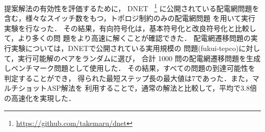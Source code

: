 \documentclass[dvipdfmx,a4paper]{jsarticle}
\begin{document}
提案解法の有効性を評価するために，
DNET%
~\footnote{%
\url{https://github.com/takemaru/dnet}}
に公開されている配電網問題を含む，様々なスイッチ数をもつ，トポロジ制約のみの配電網問題
を用いて実行実験を行なった．
その結果，有向符号化は，基本符号化と改良符号化と比較して，より多くの問
題をより高速に解くことが確認できた．
%
配電網遷移問題の実行実験については，DNETで公開されている実用規模の
問題({\sf fukui-tepco})に対して，実行可能解のペアをランダムに選び，
合計 1000 問の配電網遷移問題を生成しベンチマーク問題として使用した．
その結果，すべての問題の到達可能性を判定することができ，
得られた最短ステップ長の最大値は7であった．また，マルチショットASP解法を
利用することで，通常の解法と比較して，平均で3.8倍の高速化を実現した．
\end{document}

